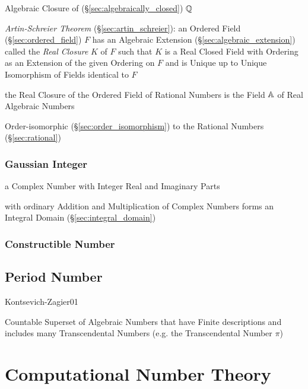 Algebraic Closure of (\S\ref{sec:algebraically_closed}) $\mathbb{Q}$

\emph{Artin-Schreier Theorem} (\S\ref{sec:artin_schreier}):
an Ordered Field (\S\ref{sec:ordered_field}) $F$ has an Algebraic Extension
(\S\ref{sec:algebraic_extension}) called the \emph{Real Closure} $K$ of $F$
such that $K$ is a Real Closed Field with Ordering as an Extension of the given
Ordering on $F$ and is Unique up to Unique Isomorphism of Fields identical to
$F$

the Real Closure of the Ordered Field of Rational Numbers is the Field
$\mathbb{A}$ of Real Algebraic Numbers

Order-isomorphic (\S\ref{sec:order_isomorphism}) to the Rational
Numbers (\S\ref{sec:rational})



\subsubsection{Gaussian Integer}\label{sec:gaussian_integer}\hfill

a Complex Number with Integer Real and Imaginary Parts

with ordinary Addition and Multiplication of Complex Numbers forms an Integral
Domain (\S\ref{sec:integral_domain})



\subsubsection{Constructible Number}\label{sec:constructible_number}\hfill



\subsection{Period Number}\label{sec:period_number}

Kontsevich-Zagier01

Countable Superset of Algebraic Numbers that have Finite descriptions
and includes many Transcendental Numbers (e.g. the Transcendental
Number $\pi$)



\section{Computational Number Theory}\label{sec:computational_number_theory}

